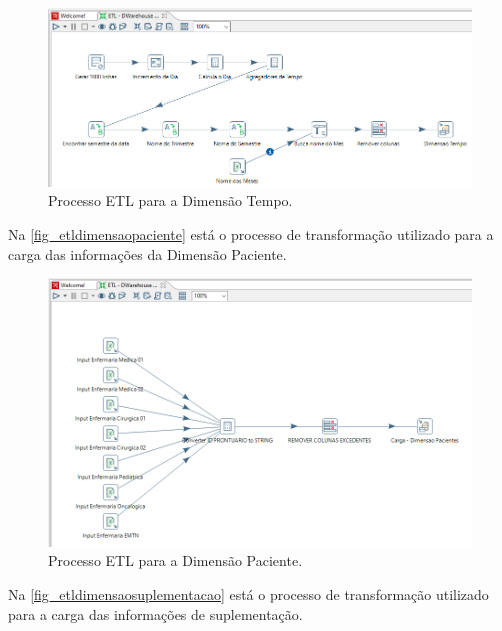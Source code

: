 \begin{figure}[htb]
	\caption{\label{fig_etldimensaotempo}Processo ETL para a Dimensão Tempo.}
	\begin{center}
	    \includegraphics[scale=0.6]{Imagens/figura - etl dw tempo.png}
	\end{center}
\end{figure}

\newpage
Na \autoref{fig_etldimensaopaciente} está o processo de transformação utilizado para a carga das informações da Dimensão Paciente.

\begin{figure}[htb]
	\caption{\label{fig_etldimensaopaciente}Processo ETL para a Dimensão Paciente.}
	\begin{center}
	    \includegraphics[scale=0.6]{Imagens/figura - etl dw paciente.png}
	\end{center}
\end{figure}

Na \autoref{fig_etldimensaosuplementacao} está o processo de transformação utilizado para a carga das informações de suplementação.

